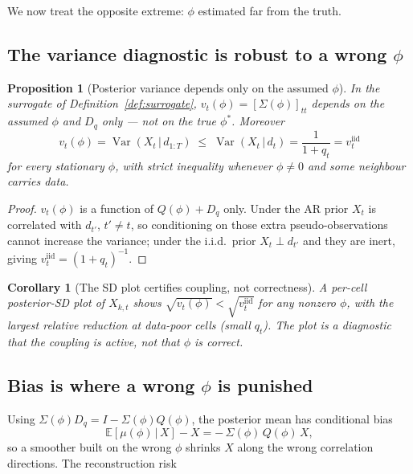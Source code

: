 \documentclass[11pt]{article}
\newtheorem{proposition}{Proposition}
\newtheorem{corollary}{Corollary}
\theoremstyle{definition}
\newcommand{\E}{\mathbb{E}}
\newcommand{\Var}{\operatorname{Var}}
\newcommand{\given}{\,\vert\,}
\begin{document}
We now treat the opposite extreme: $\phi$ estimated far from the truth.

\subsection{The variance diagnostic is robust to a wrong $\phi$}

\begin{proposition}[Posterior variance depends only on the assumed
$\phi$]
\label{prop:variance-only}
In the surrogate of Definition~\ref{def:surrogate}, $v_t(\phi) =
[\Sigma(\phi)]_{tt}$ depends on the \emph{assumed} $\phi$ and $D_q$
only --- not on the true $\phi^\ast$. Moreover
\begin{equation}
  v_t(\phi) = \Var(X_t \given d_{1:T})
    \;\le\; \Var(X_t \given d_t) = \frac{1}{1 + q_t}
    = v_t^{\mathrm{iid}}
  \label{eq:variance-monotone}
\end{equation}
for every stationary $\phi$, with strict inequality whenever
$\phi \ne 0$ and some neighbour carries data.
\end{proposition}

\begin{proof}
$v_t(\phi)$ is a function of $Q(\phi) + D_q$ only. Under the AR prior
$X_t$ is correlated with $d_{t'}$, $t' \ne t$, so conditioning on those
extra pseudo-observations cannot increase the variance; under the
i.i.d.\ prior $X_t \perp d_{t'}$ and they are inert, giving
$v_t^{\mathrm{iid}} = (1+q_t)^{-1}$.
\end{proof}

\begin{corollary}[The SD plot certifies coupling, not correctness]
\label{cor:sd-plot}
A per-cell posterior-SD plot of $X_{k,t}$ shows
$\sqrt{v_t(\phi)} < \sqrt{v_t^{\mathrm{iid}}}$ for \emph{any} nonzero
$\phi$, with the largest relative reduction at data-poor cells (small
$q_t$). The plot is a diagnostic that the coupling is \emph{active},
not that $\phi$ is \emph{correct}.
\end{corollary}

\subsection{Bias is where a wrong $\phi$ is punished}

Using $\Sigma(\phi) D_q = I - \Sigma(\phi) Q(\phi)$, the posterior
mean has conditional bias
\begin{equation}
  \E[\mu(\phi) \given X] - X = -\,\Sigma(\phi)\, Q(\phi)\, X,
  \label{eq:bias-operator}
\end{equation}
so a smoother built on the wrong $\phi$ shrinks $X$ along the wrong
correlation directions. The reconstruction risk
\end{document}
